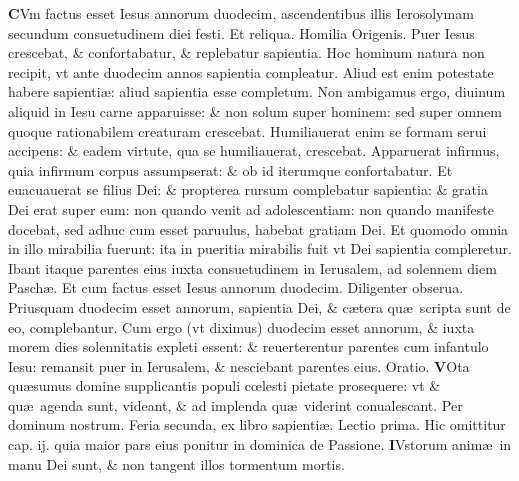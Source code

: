 \documentclass[a5paper,10pt]{book}
\def\leftmarginnote{%
	\lrmarginnote{\hskip -\marginparsep \hskip -6.5em}}
\def\rightmarginnote{%
	\lrmarginnote{\hskip\columnwidth \hskip -1em}}
\def\ae{æ}
\def\oe{œ}
\begin{document}
\begin{multicols*}{2}
\vspace{-.25em}
\lettrine[lines=2]{\bfseries \color{red} C}{}Vm\leftmarginnote{\begin{flushright}ca. 2.\end{flushright}} factus esset  Iesus annorum duodecim, ascendentibus illis Ierosolymam secundum consuetudinem diei festi.
\newline \color{red} Et reliqua. Homilia Origenis. \color{black}
\newline \color{red} P\color{black}uer Iesus crescebat, \& confortabatur, \& replebatur sapientia. Hoc hominum natura non recipit, vt ante duodecim annos sapientia compleatur.
Aliud est enim potestate habere sapienti\ae : aliud sapientia esse completum. Non ambigamus ergo, diuinum aliquid in Iesu carne apparuisse: \& non solum super hominem: sed super omnem quoque rationabilem creaturam crescebat.
Humiliauerat enim se formam serui accipens: \& eadem virtute, qua se humiliauerat, crescebat.
Apparuerat infirmus, quia infirmum corpus assumpserat: \& ob id iterumque confortabatur.
Et euacuauerat se filius Dei: \& propterea rursum complebatur sapientia: \& gratia Dei erat super eum: non quando venit ad adolescentiam: non quando manifeste docebat, sed adhuc cum esset paruulus, habebat gratiam Dei.
Et quomodo omnia in illo mirabilia fuerunt: ita in pueritia mirabilis fuit vt Dei sapientia compleretur.
Ibant itaque parentes eius iuxta consuetudinem in Ierusalem, ad solennem diem Pasch\ae . Et cum factus esset Iesus annorum duodecim.
Diligenter obserua. Priusquam duodecim esset annorum, sapientia Dei, \& c\ae tera qu\ae \ scripta sunt de eo, complebantur.
Cum ergo (vt diximus) duodecim esset annorum, \& iuxta morem dies solennitatis expleti essent: \& reuerterentur parentes cum infantulo Iesu: remansit puer in Ierusalem, \& nesciebant parentes eius. \color{red} Oratio. \color{black}
\vspace{-.25em}
\lettrine[lines=2]{\bfseries \color{red} V}{}Ota qu\ae sumus domine supplicantis populi c\oe lesti pietate prosequere: vt \& qu\ae \ agenda sunt, videant, \& ad implenda qu\ae \ viderint conualescant. Per dominum nostrum.
\newline {} \color{red} \hypertarget{MON-TERTIA-POST-ADV}{Feria secunda,} ex libro sapienti\ae . Lectio prima. Hic omittitur cap. ij. quia maior pars eius ponitur in dominica de Passione. \color{black}
\vspace{-.25em}
\lettrine[lines=2]{\bfseries I}{}\textdagger Vstorum\rightmarginnote{ca. 3.\\a} anim\ae \ in manu Dei sunt, \& non tangent illos tormentum mortis.

\end{multicols*}
\end{document}
